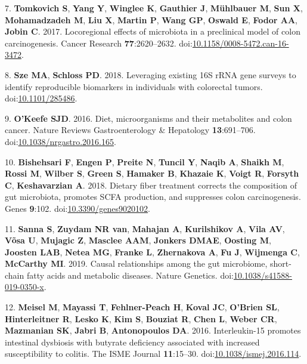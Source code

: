 \documentclass[11pt,]{article}
\begin{document}
\leavevmode\hypertarget{ref-Tomkovich2017}{}%
7. \textbf{Tomkovich S}, \textbf{Yang Y}, \textbf{Winglee K},
\textbf{Gauthier J}, \textbf{Mühlbauer M}, \textbf{Sun X},
\textbf{Mohamadzadeh M}, \textbf{Liu X}, \textbf{Martin P}, \textbf{Wang
GP}, \textbf{Oswald E}, \textbf{Fodor AA}, \textbf{Jobin C}. 2017.
Locoregional effects of microbiota in a preclinical model of colon
carcinogenesis. Cancer Research \textbf{77}:2620--2632.
doi:\href{https://doi.org/10.1158/0008-5472.can-16-3472}{10.1158/0008-5472.can-16-3472}.

\leavevmode\hypertarget{ref-Sze2018}{}%
8. \textbf{Sze MA}, \textbf{Schloss PD}. 2018. Leveraging existing 16S
rRNA gene surveys to identify reproducible biomarkers in individuals
with colorectal tumors.
doi:\href{https://doi.org/10.1101/285486}{10.1101/285486}.

\leavevmode\hypertarget{ref-OKeefe2016}{}%
9. \textbf{O'Keefe SJD}. 2016. Diet, microorganisms and their
metabolites and colon cancer. Nature Reviews Gastroenterology \&
Hepatology \textbf{13}:691--706.
doi:\href{https://doi.org/10.1038/nrgastro.2016.165}{10.1038/nrgastro.2016.165}.

\leavevmode\hypertarget{ref-Bishehsari2018}{}%
10. \textbf{Bishehsari F}, \textbf{Engen P}, \textbf{Preite N},
\textbf{Tuncil Y}, \textbf{Naqib A}, \textbf{Shaikh M}, \textbf{Rossi
M}, \textbf{Wilber S}, \textbf{Green S}, \textbf{Hamaker B},
\textbf{Khazaie K}, \textbf{Voigt R}, \textbf{Forsyth C},
\textbf{Keshavarzian A}. 2018. Dietary fiber treatment corrects the
composition of gut microbiota, promotes SCFA production, and suppresses
colon carcinogenesis. Genes \textbf{9}:102.
doi:\href{https://doi.org/10.3390/genes9020102}{10.3390/genes9020102}.

\leavevmode\hypertarget{ref-Sanna2019}{}%
11. \textbf{Sanna S}, \textbf{Zuydam NR van}, \textbf{Mahajan A},
\textbf{Kurilshikov A}, \textbf{Vila AV}, \textbf{Võsa U},
\textbf{Mujagic Z}, \textbf{Masclee AAM}, \textbf{Jonkers DMAE},
\textbf{Oosting M}, \textbf{Joosten LAB}, \textbf{Netea MG},
\textbf{Franke L}, \textbf{Zhernakova A}, \textbf{Fu J},
\textbf{Wijmenga C}, \textbf{McCarthy MI}. 2019. Causal relationships
among the gut microbiome, short-chain fatty acids and metabolic
diseases. Nature Genetics.
doi:\href{https://doi.org/10.1038/s41588-019-0350-x}{10.1038/s41588-019-0350-x}.

\leavevmode\hypertarget{ref-Meisel2016}{}%
12. \textbf{Meisel M}, \textbf{Mayassi T}, \textbf{Fehlner-Peach H},
\textbf{Koval JC}, \textbf{O'Brien SL}, \textbf{Hinterleitner R},
\textbf{Lesko K}, \textbf{Kim S}, \textbf{Bouziat R}, \textbf{Chen L},
\textbf{Weber CR}, \textbf{Mazmanian SK}, \textbf{Jabri B},
\textbf{Antonopoulos DA}. 2016. Interleukin-15 promotes intestinal
dysbiosis with butyrate deficiency associated with increased
susceptibility to colitis. The ISME Journal \textbf{11}:15--30.
doi:\href{https://doi.org/10.1038/ismej.2016.114}{10.1038/ismej.2016.114}.
\end{document}
